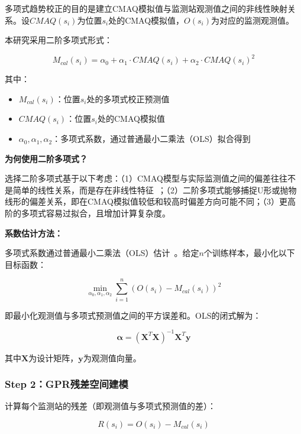 \documentclass[UTF8, a4paper, 12pt]{article}
\begin{document}
多项式趋势校正的目的是建立CMAQ模拟值与监测站观测值之间的非线性映射关系。设$CMAQ(s_i)$为位置$s_i$处的CMAQ模拟值，$O(s_i)$为对应的监测观测值。

本研究采用二阶多项式形式：

\begin{equation}
M_{cal}(s_i) = \alpha_0 + \alpha_1 \cdot CMAQ(s_i) + \alpha_2 \cdot CMAQ(s_i)^2
\end{equation}

其中：
\begin{itemize}
    \item $M_{cal}(s_i)$：位置$s_i$处的多项式校正预测值
    \item $CMAQ(s_i)$：位置$s_i$处的CMAQ模拟值
    \item $\alpha_0, \alpha_1, \alpha_2$：多项式系数，通过普通最小二乘法（OLS）拟合得到
\end{itemize}

\textbf{为何使用二阶多项式？}

选择二阶多项式基于以下考虑：（1）CMAQ模型与实际监测值之间的偏差往往不是简单的线性关系，而是存在非线性特征~\cite{zheng2020kriging}；（2）二阶多项式能够捕捉U形或抛物线形的偏差关系，即在CMAQ模拟值较低和较高时偏差方向可能不同；（3）更高阶的多项式容易过拟合，且增加计算复杂度。

\textbf{系数估计方法：}

多项式系数通过普通最小二乘法（OLS）估计~\cite{rasmussen2006gaussian}。给定$n$个训练样本，最小化以下目标函数：

\begin{equation}
\min_{\alpha_0, \alpha_1, \alpha_2} \sum_{i=1}^{n} (O(s_i) - M_{cal}(s_i))^2
\end{equation}

即最小化观测值与多项式预测值之间的平方误差和。OLS的闭式解为：

\begin{equation}
\boldsymbol{\alpha} = (\mathbf{X}^T \mathbf{X})^{-1} \mathbf{X}^T \mathbf{y}
\end{equation}

其中$\mathbf{X}$为设计矩阵，$\mathbf{y}$为观测值向量。

\subsubsection{Step 2：GPR残差空间建模}

计算每个监测站的残差（即观测值与多项式预测值的差）：

\begin{equation}
R(s_i) = O(s_i) - M_{cal}(s_i)
\end{equation}
\end{document}
